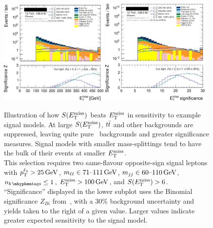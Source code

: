 \begin{figure}[tp]
\centering
\includegraphics[width=0.48\textwidth]{figures/2ljets_presel_met_logy.png}
\hfill
\includegraphics[width=0.48\textwidth]{figures/2ljets_presel_met_sig_logy.png}
\caption[
Illustration of how $\metsig$ beats $\met$ in sensitivity to example signal
models
]{
Illustration of how $\metsig$ beats $\met$ in sensitivity to example signal
models.
At large $\metsig$, $\ttbar$ and other backgrounds are suppressed, leaving
quite pure \diboson\ backgrounds and greater significance measures.
Signal models with smaller mass-splittings tend to have the bulk of their
events at smaller $\met$.
\\[0.5em]
This selection requires two same-flavour opposite-sign signal leptons with
$\pt^{\ell_2} > 25\,\eV[G]$,
$\mll \in 71\textrm{--}111\,\eV[G]$,
$\mjj \in 60\textrm{--}110\,\eV[G]$,
$\nbtag \leq 1$,
$\met > 100\,\eV[G]$, and
$\metsig > 6$.
\\[0.5em]
``Significance'' displayed in the lower subplot uses the Binomial significance
$Z_{Bi}$ from~\cite{cousins2008evaluation}, with a $30\%$ background
uncertainty and yields taken to the right of a given value.
Larger values indicate greater expected sensitivity to the signal model.
}
\label{fig:2ljets_presel_met}
\end{figure}

